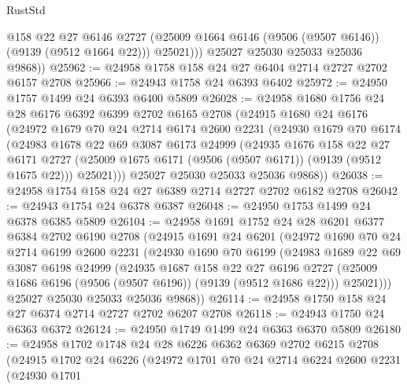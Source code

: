 \begin{lexlean}{RustStd}
\begin{coremodule}
              @158
              @22
              @27
              @6146
              @2727
              (@25009 @1664 @6146 (@9506 (@9507 @6146)) (@9139 (@9512 @1664 @22)))
              @25021)))
        @25027
        @25030
        @25033
        @25036
        @9868))
@25962 := @24958 @1758 @158 @24 @27 @6404 @2714 @2727 @2702 @6157 @2708
@25966 := @24943 @1758 @24 @6393 @6402
@25972 := @24950 @1757 @1499 @24 @6393 @6400 @5809
@26028 := @24958
    @1680
    @1756
    @24
    @28
    @6176
    @6392
    @6399
    @2702
    @6165
    @2708
    (@24915
      @1680
      @24
      @6176
      (@24972
        @1679
        @70
        @24
        @2714
        @6174
        @2600
        @2231
        (@24930
          @1679
          @70
          @6174
          (@24983
            @1678
            @22
            @69
            @3087
            @6173
            @24999
            (@24935
              @1676
              @158
              @22
              @27
              @6171
              @2727
              (@25009 @1675 @6171 (@9506 (@9507 @6171)) (@9139 (@9512 @1675 @22)))
              @25021)))
        @25027
        @25030
        @25033
        @25036
        @9868))
@26038 := @24958 @1754 @158 @24 @27 @6389 @2714 @2727 @2702 @6182 @2708
@26042 := @24943 @1754 @24 @6378 @6387
@26048 := @24950 @1753 @1499 @24 @6378 @6385 @5809
@26104 := @24958
    @1691
    @1752
    @24
    @28
    @6201
    @6377
    @6384
    @2702
    @6190
    @2708
    (@24915
      @1691
      @24
      @6201
      (@24972
        @1690
        @70
        @24
        @2714
        @6199
        @2600
        @2231
        (@24930
          @1690
          @70
          @6199
          (@24983
            @1689
            @22
            @69
            @3087
            @6198
            @24999
            (@24935
              @1687
              @158
              @22
              @27
              @6196
              @2727
              (@25009 @1686 @6196 (@9506 (@9507 @6196)) (@9139 (@9512 @1686 @22)))
              @25021)))
        @25027
        @25030
        @25033
        @25036
        @9868))
@26114 := @24958 @1750 @158 @24 @27 @6374 @2714 @2727 @2702 @6207 @2708
@26118 := @24943 @1750 @24 @6363 @6372
@26124 := @24950 @1749 @1499 @24 @6363 @6370 @5809
@26180 := @24958
    @1702
    @1748
    @24
    @28
    @6226
    @6362
    @6369
    @2702
    @6215
    @2708
    (@24915
      @1702
      @24
      @6226
      (@24972
        @1701
        @70
        @24
        @2714
        @6224
        @2600
        @2231
        (@24930
          @1701

\end{coremodule}
\end{lexlean}
